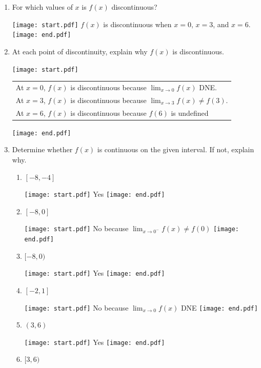 \documentclass[12pt]{article}
\begin{document}
\begin{enumerate}

\item For which values of $x$ is $f(x)$ discontinuous?

\texttt{[image: start.pdf]}
{{$f(x)$ is discontinuous when $x=0$, $x=3$, and $x=6$.} }
\texttt{[image: end.pdf]}


\item At each point of discontinuity, explain why $f(x)$ is discontinuous.

\texttt{[image: start.pdf]}
{{\begin{tabular}{l}
At $x=0$, $f(x)$ is discontinuous because $\displaystyle \lim_{x \rightarrow 0}{f(x)}$ DNE.\\
At $x=3$, $f(x)$ is discontinuous because $\displaystyle \lim_{x \rightarrow 3}{f(x)} \neq f(3)$.\\
At $x=6$, $f(x)$ is discontinuous because $f(6)$ is undefined
\end{tabular}}}
\texttt{[image: end.pdf]}


\newpage

\item Determine whether $f(x)$ is continuous on the given interval.  If not, explain why.

\begin{enumerate}

\item $[-8,-4]$

\texttt{[image: start.pdf]}
{{Yes}}
\texttt{[image: end.pdf]}


\item $[-8,0]$

\texttt{[image: start.pdf]}
{{No because $\displaystyle \lim_{x \rightarrow 0^-}{f(x)} \neq f(0)$}}
\texttt{[image: end.pdf]}


\item $[-8,0)$

\texttt{[image: start.pdf]}
{{Yes}}
\texttt{[image: end.pdf]}


\item $[-2,1]$

\texttt{[image: start.pdf]}
{{No because $\displaystyle \lim_{x\rightarrow 0}{f(x)}$ DNE}}
\texttt{[image: end.pdf]}


\item $(3,6)$

\texttt{[image: start.pdf]}
{{Yes}}
\texttt{[image: end.pdf]}


\item $[3,6)$


\end{enumerate}
\end{enumerate}
\end{document}
